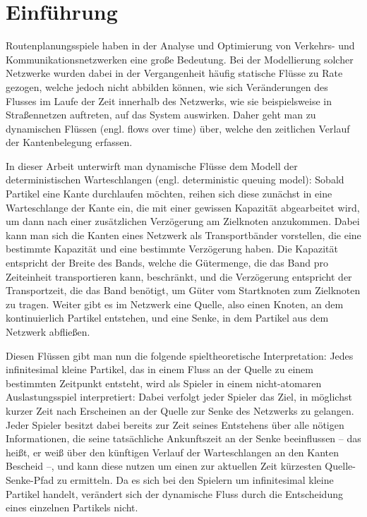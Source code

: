 \chapter{Einführung}\label{introduction}

Routenplanungsspiele haben in der Analyse und Optimierung von Verkehrs- und Kommunikationsnetzwerken eine große Bedeutung.
Bei der Modellierung solcher Netzwerke wurden dabei in der Vergangenheit häufig statische Flüsse zu Rate gezogen, welche jedoch nicht abbilden können, wie sich Veränderungen des Flusses im Laufe der Zeit innerhalb des Netzwerks, wie sie beispielsweise in Straßennetzen auftreten, auf das System auswirken.
Daher geht man zu dynamischen Flüssen (engl. flows over time) über, welche den zeitlichen Verlauf der Kantenbelegung erfassen.

In dieser Arbeit unterwirft man dynamische Flüsse dem Modell der deterministischen Warteschlangen (engl. deterministic queuing model):
Sobald Partikel eine Kante durchlaufen möchten, reihen sich diese zunächst in eine Warteschlange der Kante ein, die mit einer gewissen Kapazität abgearbeitet wird, um dann nach einer zusätzlichen Verzögerung am Zielknoten anzukommen.
Dabei kann man sich die Kanten eines Netzwerk als Transportbänder vorstellen, die eine bestimmte Kapazität und eine bestimmte Verzögerung haben.
Die Kapazität entspricht der Breite des Bands, welche die Gütermenge, die das Band pro Zeiteinheit transportieren kann,  beschränkt, und die Verzögerung entspricht der Transportzeit, die das Band benötigt, um Güter vom Startknoten zum Zielknoten zu tragen.
Weiter gibt es im Netzwerk eine Quelle, also einen Knoten, an dem kontinuierlich Partikel entstehen, und eine Senke, in dem Partikel aus dem Netzwerk abfließen.

Diesen Flüssen gibt man nun die folgende spieltheoretische Interpretation:
Jedes infinitesimal kleine Partikel, das in einem Fluss an der Quelle zu einem bestimmten Zeitpunkt entsteht, wird als Spieler in einem nicht-atomaren Auslastungsspiel interpretiert:
Dabei verfolgt jeder Spieler das Ziel, in möglichst kurzer Zeit nach Erscheinen an der Quelle zur Senke des Netzwerks zu gelangen.
Jeder Spieler besitzt dabei bereits zur Zeit seines Entstehens über alle nötigen Informationen, die seine tatsächliche Ankunftszeit an der Senke beeinflussen -- das heißt, er weiß über den künftigen Verlauf der Warteschlangen an den Kanten Bescheid --, und kann diese nutzen um einen zur aktuellen Zeit kürzesten Quelle-Senke-Pfad zu ermitteln.
Da es sich bei den Spielern um infinitesimal kleine Partikel handelt, verändert sich der dynamische Fluss durch die Entscheidung eines einzelnen Partikels nicht.

